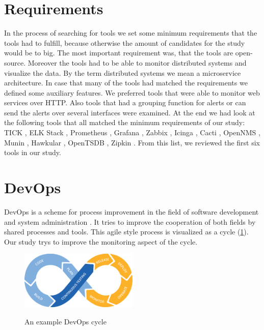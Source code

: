 \section{Requirements}
\label{minimumrequire}
In the process of searching for tools we set some minimum requirements that the tools had to fulfill, because otherwise the amount of candidates for the study would be to big. The most important requirement was, that the tools are open-source. Moreover the tools had to be able to monitor distributed systems and visualize the data. By the term distributed systems we  mean a microservice architecture.
In case that many of the tools had matched the requirements we defined some auxiliary features. We preferred tools that were able to monitor web services over HTTP. Also tools that had a grouping function for alerts or can send the alerts over several interfaces were examined.
At the end we had look at the following tools that all matched the minimum requirements of our study: TICK \cite{tick}, ELK Stack \cite{elk}, Prometheus \cite{prometheus}, Grafana \cite{grafana}, Zabbix \cite{zabbix}, Icinga \cite{icinga}, Cacti \cite{cacti}, OpenNMS \cite{opennms}, Munin \cite{munin}, Hawkular \cite{hawkular}, OpenTSDB \cite{opentsdb}, Zipkin \cite{zipkin}. From this list, we reviewed the first six tools in our study.


\section{DevOps}
\label{devops}
DevOps is a scheme for process improvement in the field of software development and system administration \cite{Bass:2015:DSA:2810087}. It tries to improve the cooperation of both fields by shared processes and tools.
This agile style process is visualized as a cycle (\cref{fig:devopscycle}). Our study trys to improve the monitoring aspect of the cycle.
\begin{figure}
	\centering
	\includegraphics[width=0.5\textwidth]{Bilder/devopscycle}
	\caption{An example DevOps cycle}
	\label{fig:devopscycle}
	\cite{Devops}
\end{figure}